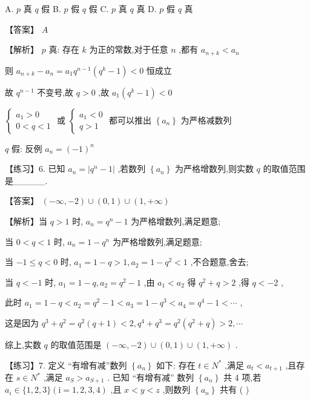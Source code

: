\documentclass[10pt]{article}
\begin{document}
A. \(p\) 真 \(q\) 假 B. \(p\) 假 \(q\) 假 C. \(p\) 真 \(q\) 真 D. \(p\) 假 \(q\) 真

【答案】 \(A\)

【解析】 \(p\) 真: 存在 \(k\) 为正的常数,对于任意 \(n\) ,都有 \({a}_{n + k} < {a}_{n}\)

则 \({a}_{n + k} - {a}_{n} = {a}_{1}{q}^{n - 1}\left( {{q}^{k} - 1}\right)  < 0\) 恒成立

故 \({q}^{n - 1}\) 不变号,故 \(q > 0\) ,故 \({a}_{1}\left( {{q}^{k} - 1}\right)  < 0\)

\(\left\{  {\begin{array}{l} {a}_{1} > 0 \\  0 < q < 1 \end{array}\text{ 或 }\left\{  {\begin{array}{l} {a}_{1} < 0 \\  q > 1 \end{array}\text{ 都可以推出 }\left\{  {a}_{n}\right\}  \text{ 为严格减数列 }}\right. }\right.\)

\(q\) 假: 反例 \({a}_{n} = {\left( -1\right) }^{n}\)

【练习】6. 已知 \({a}_{n} = \left| {{q}^{n} - 1}\right|\) ,若数列 \(\left\{  {a}_{n}\right\}\) 为严格增数列,则实数 \(q\) 的取值范围是\_\_\_\_\_.

【答案】 \(\left( {-\infty , - 2}\right)  \cup  \left( {0,1}\right)  \cup  \left( {1, + \infty }\right)\)

【解析】当 \(q > 1\) 时, \({a}_{n} = {q}^{n} - 1\) 为严格增数列,满足题意;

当 \(0 < q < 1\) 时, \({a}_{n} = 1 - {q}^{n}\) 为严格增数列,满足题意;

当 \(- 1 \leq  q < 0\) 时, \({a}_{1} = 1 - q > 1,{a}_{2} = 1 - {q}^{2} < 1\) ,不合题意,舍去;

当 \(q <  - 1\) 时, \({a}_{1} = 1 - q,{a}_{2} = {q}^{2} - 1\) ,由 \({a}_{1} < {a}_{2}\) 得 \({q}^{2} + q > 2\) ,得 \(q <  - 2\) ,

此时 \({a}_{1} = 1 - q < {a}_{2} = {q}^{2} - 1 < {a}_{3} = 1 - {q}^{3} < {a}_{4} = {q}^{4} - 1 < \cdots\) ,

这是因为 \({q}^{3} + {q}^{2} = {q}^{2}\left( {q + 1}\right)  < 2,{q}^{4} + {q}^{3} = {q}^{2}\left( {{q}^{2} + q}\right)  > 2,\cdots\)

综上,实数 \(q\) 的取值范围是 \(\left( {-\infty , - 2}\right)  \cup  \left( {0,1}\right)  \cup  \left( {1, + \infty }\right)\) .

【练习】7. 定义 “有增有减”数列 \(\left\{  {a}_{n}\right\}\) 如下: 存在 \(t \in  {N}^{ * }\) ,满足 \({a}_{t} < {a}_{t + 1}\) ,且存在 \(s \in  {N}^{ * }\) ,满足 \({a}_{S} > {a}_{S + 1}\) . 已知 “有增有减” 数列 \(\left\{  {a}_{n}\right\}\) 共 4 项,若 \({a}_{i} \in  \{ 1,2,3\} \left( {\mathrm{i} = 1,2,3,4}\right)\) ,且 \(x < y < z\) ,则数列 \(\left\{  {a}_{n}\right\}\) 共有 ( )
\end{document}
